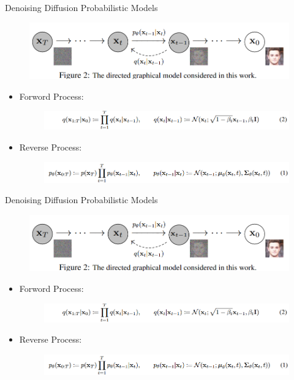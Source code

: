 \documentclass[notheorems, aspectratio=54]{beamer}
\begin{document}
\begin{frame}{Denoising Diffusion Probabilistic Models}
  \begin{figure}[!h]
      \centering
      \includegraphics[width=0.8\linewidth]{figures/ddpm_fig2.png}
  \end{figure}
  \begin{itemize}
    \item Forword Process:
    \begin{figure}[!h]
      \centering
      \includegraphics[width=1.0\linewidth]{figures/ddpm_formulation2.png}
    \end{figure}
    \item Reverse Process:
    \begin{figure}[!h]
      \centering
      \includegraphics[width=1.0\linewidth]{figures/ddpm_formulation1.png}
    \end{figure}
  \end{itemize}
\end{frame}

\begin{frame}{Denoising Diffusion Probabilistic Models}
  \begin{figure}[!h]
      \centering
      \includegraphics[width=0.8\linewidth]{figures/ddpm_fig2.png}
  \end{figure}
  \begin{itemize}
    \item Forword Process:
    \begin{figure}[!h]
      \centering
      \includegraphics[width=1.0\linewidth]{figures/ddpm_formulation2.png}
    \end{figure}
    \item Reverse Process:
    \begin{figure}[!h]
      \centering
      \includegraphics[width=1.0\linewidth]{figures/ddpm_formulation1.png}
    \end{figure}
  \end{itemize}
\end{frame}
\end{document}
